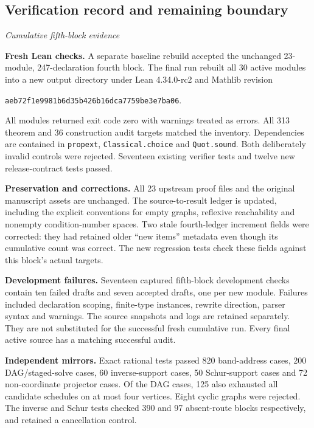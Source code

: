 \documentclass[11pt,letterpaper]{article}
\theoremstyle{definition}
\theoremstyle{remark}
\newcommand{\code}[1]{\texttt{#1}}
\begin{document}
\subsection{Verification record and remaining boundary}\label{supp5:subsection:007}\textit{Cumulative fifth-block evidence}\par
\textbf{Fresh Lean checks.} A separate baseline rebuild accepted the unchanged 23-module, 247-declaration fourth block. The final run rebuilt all 30 active modules into a new output directory under Lean 4.34.0-rc2 and Mathlib revision
\begin{center}\code{aeb72f1e9981b6d35b426b16dca7759be3e7ba06}.\end{center}
All modules returned exit code zero with warnings treated as errors. All 313 theorem and 36 construction audit targets matched the inventory. Dependencies are contained in \code{propext}, \code{Classical.choice} and \code{Quot.sound}. Both deliberately invalid controls were rejected. Seventeen existing verifier tests and twelve new release-contract tests passed.

\textbf{Preservation and corrections.} All 23 upstream proof files and the original manuscript assets are unchanged. The source-to-result ledger is updated, including the explicit conventions for empty graphs, reflexive reachability and nonempty condition-number spaces. Two stale fourth-ledger increment fields were corrected: they had retained older ``new items'' metadata even though its cumulative count was correct. The new regression tests check these fields against this block's actual targets.

\textbf{Development failures.} Seventeen captured fifth-block development checks contain ten failed drafts and seven accepted drafts, one per new module. Failures included declaration scoping, finite-type instances, rewrite direction, parser syntax and warnings. The source snapshots and logs are retained separately. They are not substituted for the successful fresh cumulative run. Every final active source has a matching successful audit.

\textbf{Independent mirrors.} Exact rational tests passed 820 band-address cases, 200 DAG/staged-solve cases, 60 inverse-support cases, 50 Schur-support cases and 72 non-coordinate projector cases. Of the DAG cases, 125 also exhausted all candidate schedules on at most four vertices. Eight cyclic graphs were rejected. The inverse and Schur tests checked 390 and 97 absent-route blocks respectively, and retained a cancellation control.
\end{document}
